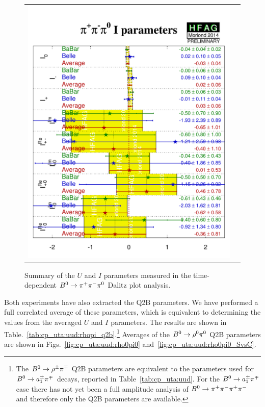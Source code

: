 \begin{figure}[htbp]
\begin{center}
\begin{tabular}{cc}
{        \includegraphics{figures/cp_uta/pi+pi-pi0_I}
      }
    \end{tabular}
  \end{center}
  \vspace{-0.8cm}
  \caption{
    Summary of the $U$ and $I$ parameters measured in the 
    time-dependent $B^0 \to \pi^+\pi^-\pi^0$ Dalitz plot analysis.
  }
  \label{fig:cp_uta:uud:uandi}
\end{figure}

Both experiments have also extracted the Q2B parameters.
We have performed a full correlated average of these parameters,
which is equivalent to determining the values from the 
averaged $U$ and $I$ parameters.
The results are shown in Table.~\ref{tab:cp_uta:uud:rhopi_q2b}.\footnote{
  The $B^0 \to \rho^\pm \pi^\mp$ Q2B parameters are equivalent to the
  parameters used for $B^0 \to a_1^\pm \pi^\mp$ decays, reported in
  Table~\ref{tab:cp_uta:uud}.   
  For the $B^0 \to a_1^\pm \pi^\mp$ case there has not yet been a full
  amplitude analysis of $B^0 \to \pi^+\pi^-\pi^+\pi^-$ and therefore only the
  Q2B parameters are available.
}
Averages of the $B^0 \to \rho^0\pi^0$ Q2B parameters are shown in 
Figs.~\ref{fig:cp_uta:uud:rho0pi0} and~\ref{fig:cp_uta:uud:rho0pi0_SvsC}.

